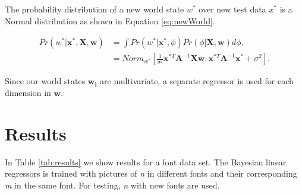 \documentclass[12pt]{article}
\begin{document}
The probability distribution of a new world state $w^*$ over new test data $x^*$ is a Normal distribution as shown in Equation \ref{eq:newWorld}.

\begin{equation}
\begin{split}
\label{eq:newWorld}
Pr(w^* | \mathbf{x}^*, \mathbf{X}, \mathbf{w}) &= \int Pr(w^* | \mathbf{x}^*, \phi) Pr(\phi | \mathbf{X}, \mathbf{w} ) d \phi,\\
 &= Norm_{w^*} \left[ \frac{1}{\sigma^2} \mathbf{x}^{*T} \mathbf{A}^{-1} \mathbf{X} \mathbf{w}, \mathbf{x}^{*T} \mathbf{A}^{-1} \mathbf{x}^* + \sigma^2  \right].
\end{split}
\end{equation}

Since our world states $\mathbf{w_i}$ are multivariate, a separate regressor is used for each dimension in  $\mathbf{w}$.

\section{Results}

In Table \ref{tab:results} we show results for a font data set.
The Bayesian linear regressors is trained with pictures of \emph{n} in different fonts and their corresponding \emph{m} in the same font.
For testing, \emph{n} with new fonts are used.
\end{document}
